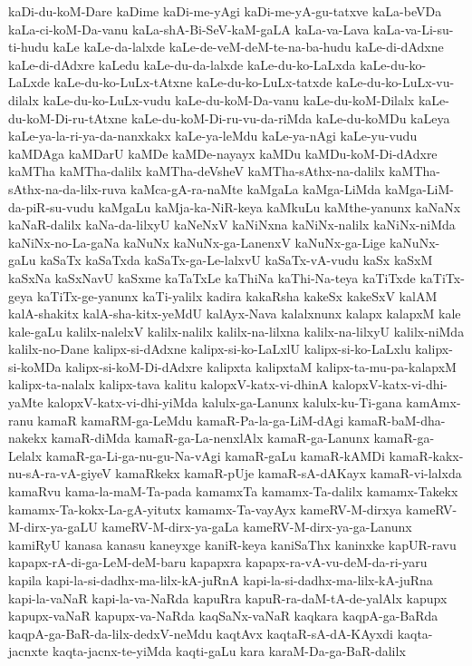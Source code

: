 {kaDi-du-koM-Dare
kaDime
kaDi-me-yAgi
kaDi-me-yA-gu-tatxve
kaLa-beVDa
kaLa-ci-koM-Da-vanu
kaLa-shA-Bi-SeV-kaM-gaLA
kaLa-va-Lava
kaLa-va-Li-su-ti-hudu
kaLe
kaLe-da-lalxde
kaLe-de-veM-deM-te-na-ba-hudu
kaLe-di-dAdxne
kaLe-di-dAdxre
kaLedu
kaLe-du-da-lalxde
kaLe-du-ko-LaLxda
kaLe-du-ko-LaLxde
kaLe-du-ko-LuLx-tAtxne
kaLe-du-ko-LuLx-tatxde
kaLe-du-ko-LuLx-vu-dilalx
kaLe-du-ko-LuLx-vudu
kaLe-du-koM-Da-vanu
kaLe-du-koM-Dilalx
kaLe-du-koM-Di-ru-tAtxne
kaLe-du-koM-Di-ru-vu-da-riMda
kaLe-du-koMDu
kaLeya
kaLe-ya-la-ri-ya-da-nanxkakx
kaLe-ya-leMdu
kaLe-ya-nAgi
kaLe-yu-vudu
kaMDAga
kaMDarU
kaMDe
kaMDe-nayayx
kaMDu
kaMDu-koM-Di-dAdxre
kaMTha
kaMTha-dalilx
kaMTha-deVsheV
kaMTha-sAthx-na-dalilx
kaMTha-sAthx-na-da-lilx-ruva
kaMca-gA-ra-naMte
kaMgaLa
kaMga-LiMda
kaMga-LiM-da-piR-su-vudu
kaMgaLu
kaMja-ka-NiR-keya
kaMkuLu
kaMthe-yanunx
kaNaNx
kaNaR-dalilx
kaNa-da-lilxyU
kaNeNxV
kaNiNxna
kaNiNx-nalilx
kaNiNx-niMda
kaNiNx-no-La-gaNa
kaNuNx
kaNuNx-ga-LanenxV
kaNuNx-ga-Lige
kaNuNx-gaLu
kaSaTx
kaSaTxda
kaSaTx-ga-Le-lalxvU
kaSaTx-vA-vudu
kaSx
kaSxM
kaSxNa
kaSxNavU
kaSxme
kaTaTxLe
kaThiNa
kaThi-Na-teya
kaTiTxde
kaTiTx-geya
kaTiTx-ge-yanunx
kaTi-yalilx
kadira
kakaRsha
kakeSx
kakeSxV
kalAM
kalA-shakitx
kalA-sha-kitx-yeMdU
kalAyx-Nava
kalalxnunx
kalapx
kalapxM
kale
kale-gaLu
kalilx-nalelxV
kalilx-nalilx
kalilx-na-lilxna
kalilx-na-lilxyU
kalilx-niMda
kalilx-no-Dane
kalipx-si-dAdxne
kalipx-si-ko-LaLxlU
kalipx-si-ko-LaLxlu
kalipx-si-koMDa
kalipx-si-koM-Di-dAdxre
kalipxta
kalipxtaM
kalipx-ta-mu-pa-kalapxM
kalipx-ta-nalalx
kalipx-tava
kalitu
kalopxV-katx-vi-dhinA
kalopxV-katx-vi-dhi-yaMte
kalopxV-katx-vi-dhi-yiMda
kalulx-ga-Lanunx
kalulx-ku-Ti-gana
kamAmx-ranu
kamaR
kamaRM-ga-LeMdu
kamaR-Pa-la-ga-LiM-dAgi
kamaR-baM-dha-nakekx
kamaR-diMda
kamaR-ga-La-nenxlAlx
kamaR-ga-Lanunx
kamaR-ga-Lelalx
kamaR-ga-Li-ga-nu-gu-Na-vAgi
kamaR-gaLu
kamaR-kAMDi
kamaR-kakx-nu-sA-ra-vA-giyeV
kamaRkekx
kamaR-pUje
kamaR-sA-dAKayx
kamaR-vi-lalxda
kamaRvu
kama-la-maM-Ta-pada
kamamxTa
kamamx-Ta-dalilx
kamamx-Takekx
kamamx-Ta-kokx-La-gA-yitutx
kamamx-Ta-vayAyx
kameRV-M-dirxya
kameRV-M-dirx-ya-gaLU
kameRV-M-dirx-ya-gaLa
kameRV-M-dirx-ya-ga-Lanunx
kamiRyU
kanasa
kanasu
kaneyxge
kaniR-keya
kaniSaThx
kaninxke
kapUR-ravu
kapapx-rA-di-ga-LeM-deM-baru
kapapxra
kapapx-ra-vA-vu-deM-da-ri-yaru
kapila
kapi-la-si-dadhx-ma-lilx-kA-juRnA
kapi-la-si-dadhx-ma-lilx-kA-juRna
kapi-la-vaNaR
kapi-la-va-NaRda
kapuRra
kapuR-ra-daM-tA-de-yalAlx
kapupx
kapupx-vaNaR
kapupx-va-NaRda
kaqSaNx-vaNaR
kaqkara
kaqpA-ga-BaRda
kaqpA-ga-BaR-da-lilx-dedxV-neMdu
kaqtAvx
kaqtaR-sA-dA-KAyxdi
kaqta-jacnxte
kaqta-jacnx-te-yiMda
kaqti-gaLu
kara
karaM-Da-ga-BaR-dalilx
}
